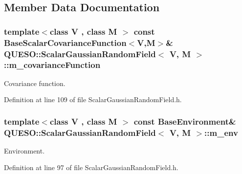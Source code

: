 \subsection{Member Data Documentation}
\hypertarget{class_q_u_e_s_o_1_1_scalar_gaussian_random_field_a7db273a4030d7bede05d9d4ef0efd043}{
\subsubsection[{m\-\_\-covariance\-Function}]{\setlength{\rightskip}{0pt plus 5cm}template$<$class V , class M $>$ const {\bf Base\-Scalar\-Covariance\-Function}$<$V,M$>$\& {\bf Q\-U\-E\-S\-O\-::\-Scalar\-Gaussian\-Random\-Field}$<$ V, M $>$\-::m\-\_\-covariance\-Function\hspace{0.3cm}{\ttfamily [protected]}}}\label{class_q_u_e_s_o_1_1_scalar_gaussian_random_field_a7db273a4030d7bede05d9d4ef0efd043}


Covariance function. 



Definition at line 109 of file Scalar\-Gaussian\-Random\-Field.\-h.

\hypertarget{class_q_u_e_s_o_1_1_scalar_gaussian_random_field_af1f041e02404457420e5b32dee70edc3}{
\subsubsection[{m\-\_\-env}]{\setlength{\rightskip}{0pt plus 5cm}template$<$class V , class M $>$ const {\bf Base\-Environment}\& {\bf Q\-U\-E\-S\-O\-::\-Scalar\-Gaussian\-Random\-Field}$<$ V, M $>$\-::m\-\_\-env\hspace{0.3cm}{\ttfamily [protected]}}}\label{class_q_u_e_s_o_1_1_scalar_gaussian_random_field_af1f041e02404457420e5b32dee70edc3}


Environment. 



Definition at line 97 of file Scalar\-Gaussian\-Random\-Field.\-h.

